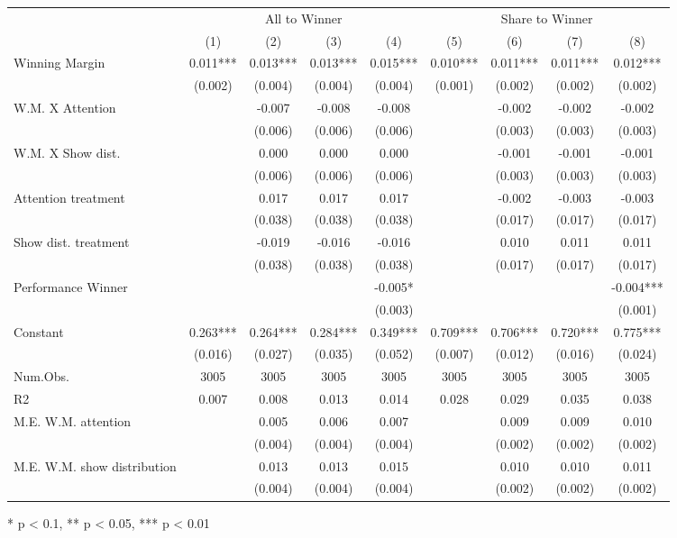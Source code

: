 \begin{table}[t]
\fontsize{12.0pt}{14.4pt}\selectfont
\begin{tabular*}{\linewidth}{@{\extracolsep{\fill}}lcccccccc}
\toprule
 & \multicolumn{4}{c}{All to Winner} & \multicolumn{4}{c}{Share to Winner} \\ 
\cmidrule(lr){2-5} \cmidrule(lr){6-9}
  & (1) & (2) & (3) & (4) & (5) & (6) & (7) & (8) \\ 
\midrule\addlinespace[2.5pt]
Winning Margin & 0.011*** & 0.013*** & 0.013*** & 0.015*** & 0.010*** & 0.011*** & 0.011*** & 0.012*** \\ 
 & (0.002) & (0.004) & (0.004) & (0.004) & (0.001) & (0.002) & (0.002) & (0.002) \\ 
W.M. X Attention &  & -0.007 & -0.008 & -0.008 &  & -0.002 & -0.002 & -0.002 \\ 
 &  & (0.006) & (0.006) & (0.006) &  & (0.003) & (0.003) & (0.003) \\ 
W.M. X Show dist. &  & 0.000 & 0.000 & 0.000 &  & -0.001 & -0.001 & -0.001 \\ 
 &  & (0.006) & (0.006) & (0.006) &  & (0.003) & (0.003) & (0.003) \\ 
Attention treatment &  & 0.017 & 0.017 & 0.017 &  & -0.002 & -0.003 & -0.003 \\ 
 &  & (0.038) & (0.038) & (0.038) &  & (0.017) & (0.017) & (0.017) \\ 
Show dist. treatment &  & -0.019 & -0.016 & -0.016 &  & 0.010 & 0.011 & 0.011 \\ 
 &  & (0.038) & (0.038) & (0.038) &  & (0.017) & (0.017) & (0.017) \\ 
Performance Winner &  &  &  & -0.005* &  &  &  & -0.004*** \\ 
 &  &  &  & (0.003) &  &  &  & (0.001) \\ 
Constant & 0.263*** & 0.264*** & 0.284*** & 0.349*** & 0.709*** & 0.706*** & 0.720*** & 0.775*** \\ 
{} & {(0.016)} & {(0.027)} & {(0.035)} & {(0.052)} & {(0.007)} & {(0.012)} & {(0.016)} & {(0.024)} \\ 
Num.Obs. & 3005 & 3005 & 3005 & 3005 & 3005 & 3005 & 3005 & 3005 \\ 
R2 & 0.007 & 0.008 & 0.013 & 0.014 & 0.028 & 0.029 & 0.035 & 0.038 \\ 
M.E. W.M. attention &  & 0.005 & 0.006 & 0.007 &  & 0.009 & 0.009 & 0.010 \\ 
 &  & (0.004) & (0.004) & (0.004) &  & (0.002) & (0.002) & (0.002) \\ 
M.E. W.M. show distribution &  & 0.013 & 0.013 & 0.015 &  & 0.010 & 0.010 & 0.011 \\ 
 &  & (0.004) & (0.004) & (0.004) &  & (0.002) & (0.002) & (0.002) \\ 
\bottomrule
\end{tabular*}
\begin{minipage}{\linewidth}
* p < 0.1, ** p < 0.05, *** p < 0.01\\
\end{minipage}
\end{table}


